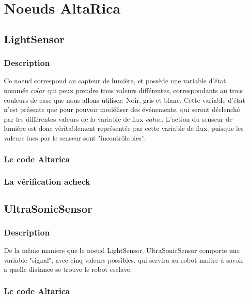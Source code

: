  \section{Noeuds AltaRica}
 
  \subsection{LightSensor}

  \subsubsection{Description}

  Ce noeud correspond au capteur de lumière, et possède une variable d'état nommée $color$ qui   peux prendre trois valeurs différentes, correspondants au trois couleurs de case que nous allons utiliser: Noir, gris et blanc. Cette variable d'état n'est présente que pour pouvoir modéliser des événements, qui seront déclenché par les différentes valeurs de la variable de flux $value$. L'action du senseur de lumière est donc véritablement représentée par cette variable de flux, puisque les valeurs lues par le senseur sont "incontrôlables".

   \subsubsection{Le code Altarica}
   
   
   \subsubsection{La vérification acheck}
   
   
  \subsection{UltraSonicSensor}
  
   \subsubsection{Description}
   De la même maniere que le noeud LightSensor, UltraSonicSensor
   comporte une variable "signal", avec cinq valeurs possibles, qui
   servira au robot maitre à savoir a quelle distance se trouve le robot
   esclave.

   \subsubsection{Le code Altarica}
   
   
